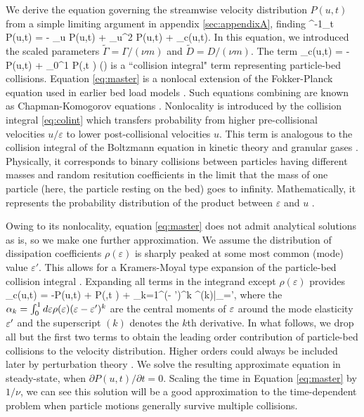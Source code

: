 We derive the equation governing the streamwise velocity distribution $P(u,t)$ from a simple limiting argument in appendix \ref{sec:appendixA}, finding
\be \nu^{-1}\partial_t P(u,t) = - \tilde{\Gamma} \partial_u P(u,t) +  \partial_u^2 P(u,t) + _c(u,t). \label{eq:master} \ee
In this equation, we introduced the scaled parameters $\tilde{\Gamma} = \Gamma/(\nu m)$ and $\tilde{D} = D/(\nu m)$. The term
\be {}_c(u,t) = - P(u,t) + \int_0^1 P\big(,t \big) \rho(\ve) \label{eq:colint} \ee
is a ``collision integral" term representing particle-bed collisions.
Equation \ref{eq:master} is a nonlocal extension of the Fokker-Planck equation used in earlier bed load models \citep{Fan2014,Ancey2014}. 
Such equations combining are known as Chapman-Komogorov equations \citep{Gardiner1983}. 
Nonlocality is introduced by the collision integral \ref{eq:colint} which transfers probability from higher pre-collisional velocities $u/\varepsilon$ to lower post-collisional velocities $u$.
This term is analogous to the collision integral of the Boltzmann equation in kinetic theory and granular gases \citep{Duderstadt1979, Brilliantov2004}. Physically, it corresponds to binary collisions between particles having different masses and random resitution coefficients \cite{Serero2015} in the limit that the mass of one particle (here, the particle resting on the bed) goes to infinity. Mathematically, it represents the probability distribution of the product between $\varepsilon$ and $u$ \citep[c.f.][]{Feller1968}.

Owing to its nonlocality, equation \ref{eq:master} does not admit analytical solutions as is, so we make one further approximation.
We assume the distribution of dissipation coefficients $\rho(\varepsilon)$ is sharply peaked at some most common (mode) value $\varepsilon'$. This allows for a Kramers-Moyal type expansion of the particle-bed collision integral \citep{Gardiner1983}.
Expanding all terms in the integrand except $\rho(\varepsilon)$ provides
\be {}_c(u,t) = -P(u,t) + P\big(,t \big) + \sum_{k=1}^\infty {}(\ve - \ve')^k ^{(k)}\Big|_{\ve=\ve'},\label{eq:expansion}\ee
where the $\alpha_k = \int_0^1 d\varepsilon \rho(\varepsilon) (\varepsilon-\varepsilon')^k $ are the central moments of $\varepsilon$ around the mode elasticity $\varepsilon'$ and the superscript $(k)$ denotes the $k$th derivative.
In what follows, we drop all but the first two terms to obtain the leading order contribution of particle-bed collisions to the velocity distribution. Higher orders could always be included later by perturbation theory \citep{Morse1953}. We solve the resulting approximate equation in steady-state, when $\partial P(u,t)/\partial t = 0$. Scaling the time in Equation \ref{eq:master} by $1/\nu$, we can see this solution will be a good approximation to the time-dependent problem when particle motions generally survive multiple collisions.

